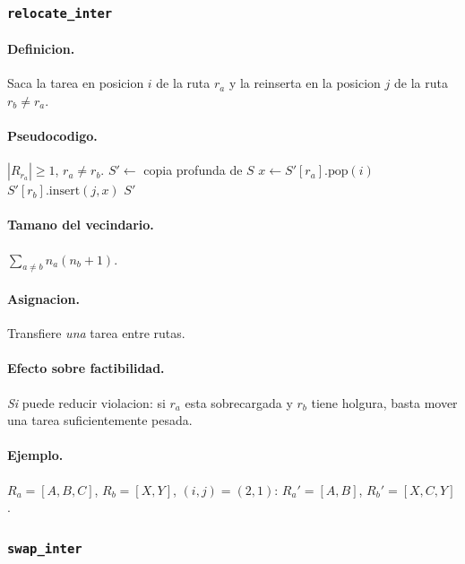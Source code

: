 \documentclass[11pt,a4paper]{article}
\newcommand{\op}[1]{\texttt{#1}}
\begin{document}
\subsubsection{\op{relocate\_inter}}

\paragraph{Definicion.} Saca la tarea en posicion $i$ de la ruta
$r_a$ y la reinserta en la posicion $j$ de la ruta $r_b\neq r_a$.

\paragraph{Pseudocodigo.}
\begin{algorithm}[H]
\caption{\op{relocate\_inter}($S, r_a, i, r_b, j$)}
\begin{algorithmic}[1]
\Require $|R_{r_a}|\ge 1$, $r_a\neq r_b$.
\State $S' \gets$ copia profunda de $S$
\State $x \gets S'[r_a].\text{pop}(i)$
\State $S'[r_b].\text{insert}(j, x)$
\State \Return $S'$
\end{algorithmic}
\end{algorithm}

\paragraph{Tamano del vecindario.}
$\sum_{a\neq b} n_a (n_b+1)$.

\paragraph{Asignacion.} Transfiere \emph{una} tarea entre rutas.

\paragraph{Efecto sobre factibilidad.} \emph{Si} puede reducir
violacion: si $r_a$ esta sobrecargada y $r_b$ tiene holgura, basta
mover una tarea suficientemente pesada.

\paragraph{Ejemplo.} $R_a=[A,B,C]$, $R_b=[X,Y]$, $(i,j)=(2,1)$:
$R_a'=[A,B]$, $R_b'=[X,C,Y]$.

\subsubsection{\op{swap\_inter}}
\end{document}
